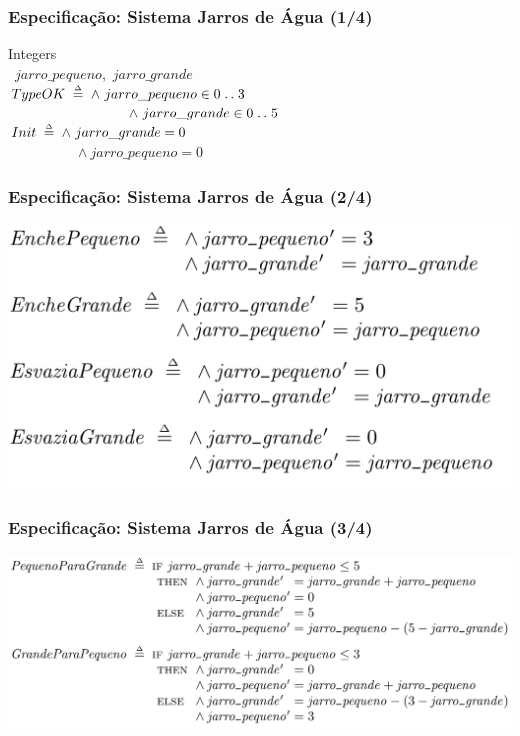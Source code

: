 \documentclass{beamer}
\begin{document}
\begin{frame}
  \frametitle{Especificação: Sistema Jarros de Água (1/4)}
  {\EXTENDS} Integers\\
  \vspace{8.0pt}
  \VARIABLES\ $jarro\_pequeno$,\, $jarro\_grande$\\
  \vspace{8.0pt}
  $TypeOK \;\mathrel{\smash {{\stackrel{\scriptscriptstyle\Delta}{=}}}}\; \land\ jarro\_pequeno \in 0 \mathrel{\ldotp\ldotp} 3$\\
  ~~~~~~~~~~~~~~~~~$\land\ jarro\_grande \in 0 \mathrel{\ldotp\ldotp} 5$\\
  \vspace{8.0pt}
  $Init \;\mathrel{\smash {{\stackrel{\scriptscriptstyle\Delta}{=}}}}\; \land\ jarro\_grande = 0$\\
  ~~~~~~~~~~$\land\ jarro\_pequeno = 0$
  \vspace{8.0pt}%
\end{frame}

\begin{frame}
  \frametitle{Especificação: Sistema Jarros de Água (2/4)}
  \includegraphics[scale=0.25]{img/jarros_1.png}
\end{frame}

\begin{frame}
  \frametitle{Especificação: Sistema Jarros de Água (3/4)}
  \hspace{-10mm}
  \includegraphics[scale=0.25]{img/jarros_2.png}
\end{frame}
\end{document}
